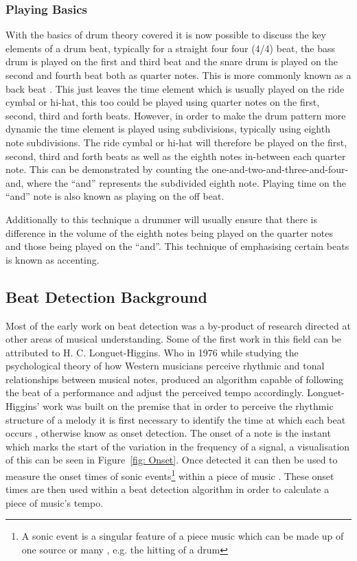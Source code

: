\documentclass[a4paper, 11pt]{article}
\begin{document}
\subsubsection{Playing Basics}
With the basics of drum theory covered it is now possible to discuss the key elements of a drum beat, typically for a straight four four (4/4) beat, the bass drum is played on the first and third beat and the snare drum is played on the second and fourth beat both as quarter notes. This is more commonly known as a back beat \cite{drum-bible}. This just leaves the time element which is usually played on the ride cymbal or hi-hat, this too could be played using quarter notes on the first, second, third and forth beats. However, in order to make the drum pattern more dynamic the time element is played using subdivisions, typically using eighth note subdivisions. The ride cymbal or hi-hat will therefore be played on the first, second, third and forth beats as well as the eighth notes in-between each quarter note. This can be demonstrated by counting the one-and-two-and-three-and-four-and, where the ``and'' represents the subdivided eighth note. Playing time on the ``and'' note is also known as playing on the off beat. \par

Additionally to this technique a drummer will usually ensure that there is difference in the volume of the eighth notes being played on the quarter notes and those being played on the ``and''. This technique of emphasising certain beats is known as accenting. 


\subsection{Beat Detection Background}
Most of the early work on beat detection was a by-product of research directed at other areas of musical understanding. Some of the first work in this field can be attributed to H. C. Longuet-Higgins. Who in 1976 while studying the psychological theory of how Western musicians perceive rhythmic and tonal relationships between musical notes, produced an algorithm capable of following the beat of a performance and adjust the perceived tempo accordingly\cite{allen-danneburg}. Longuet-Higgins' work was built on the premise that in order to perceive the rhythmic structure of a melody it is first necessary to identify the time at which each beat occurs \cite{longeut1}, otherwise know as onset detection. The onset of a note is the instant which marks the start of the variation in the frequency of a signal, a visualisation of this can be seen in Figure~\ref{fig: Onset}. Once detected it can then be used to measure the onset times of sonic events\footnote{A sonic event is a singular feature of a piece music which can be made up of one source or many \cite{sonic}, e.g. the hitting of a drum} within a piece of music \cite{mirex-onset}. These onset times are then used within a beat detection algorithm in order to calculate a piece of music's tempo. 
\end{document}
